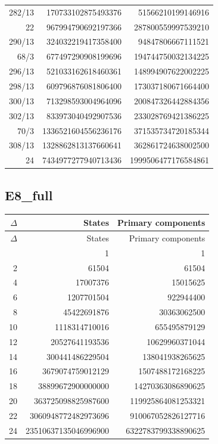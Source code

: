 \begin{longtable}{@{}rrr@{}}
282/13 & 170733102875493376 & 51566210199146916\\
22 & 967994790692197366 & 287800559997539210\\
290/13 & 324032219417358400 & 94847806667111521\\
68/3 & 677497290908199696 & 194744750032134225\\
296/13 & 521033162618460361 & 148994907622002225\\
298/13 & 609796876081806400 & 173037180671664400\\
300/13 & 713298593004964096 & 200847326442884356\\
302/13 & 833973040492907536 & 233028769421386225\\
70/3 & 1336521604556236176 & 371535734720185344\\
308/13 & 1328862813137660641 & 362861724638002500\\
24 & 7434977277940713436 & 1999506477176584861\\
\end{longtable}
\endgroup
\subsection{E8\_full}

\begingroup\small
\setlength{\tabcolsep}{5pt}
\begin{longtable}{@{}rrr@{}}
\toprule
$\Delta$ & States & Primary components\\
\midrule\endfirsthead
\toprule
$\Delta$ & States & Primary components\\
\midrule\endhead
\bottomrule\endfoot
0 & 1 & 1\\
2 & 61504 & 61504\\
4 & 17007376 & 15015625\\
6 & 1207701504 & 922944400\\
8 & 45422691876 & 30363062500\\
10 & 1118314710016 & 655495879129\\
12 & 20527641193536 & 10629960371044\\
14 & 300441486229504 & 138041938265625\\
16 & 3679074759012129 & 1507488172168225\\
18 & 38899672900000000 & 14270363086890625\\
20 & 363725098825987600 & 119925864081253321\\
22 & 3060948772482973696 & 910067052826127716\\
24 & 23510637135046996900 & 6322783799338890625\\
\end{longtable}
\endgroup
